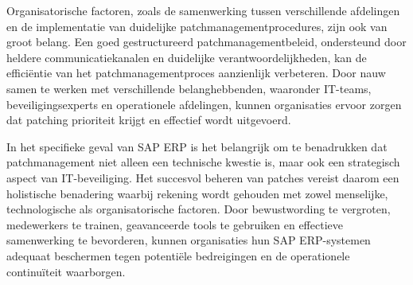 Organisatorische factoren, zoals de samenwerking tussen verschillende afdelingen en de implementatie van duidelijke patchmanagementprocedures, zijn ook van groot belang. Een goed gestructureerd patchmanagementbeleid, ondersteund door heldere communicatiekanalen en duidelijke verantwoordelijkheden, kan de efficiëntie van het patchmanagementproces aanzienlijk verbeteren. Door nauw samen te werken met verschillende belanghebbenden, waaronder IT-teams, beveiligingsexperts en operationele afdelingen, kunnen organisaties ervoor zorgen dat patching prioriteit krijgt en effectief wordt uitgevoerd.

In het specifieke geval van SAP ERP is het belangrijk om te benadrukken dat patchmanagement niet alleen een technische kwestie is, maar ook een strategisch aspect van IT-beveiliging. Het succesvol beheren van patches vereist daarom een holistische benadering waarbij rekening wordt gehouden met zowel menselijke, technologische als organisatorische factoren. Door bewustwording te vergroten, medewerkers te trainen, geavanceerde tools te gebruiken en effectieve samenwerking te bevorderen, kunnen organisaties hun SAP ERP-systemen adequaat beschermen tegen potentiële bedreigingen en de operationele continuïteit waarborgen. \autocite{Graffeo2018}


